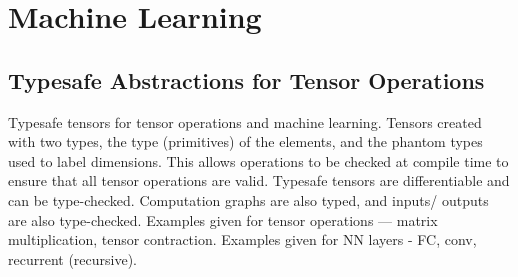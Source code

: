 \chapter {Machine Learning}

\section {Typesafe Abstractions for Tensor Operations \cite{chen2017typesafe}}
Typesafe tensors for tensor operations and machine learning. Tensors created
with two types, the type (primitives) of the elements, and the phantom types
used to label dimensions. This allows operations to be checked at compile time
to ensure that all tensor operations are valid. Typesafe tensors are
differentiable and can be type-checked. Computation graphs are also typed, and
inputs/ outputs are also type-checked. Examples given for tensor operations ---
matrix multiplication, tensor contraction. Examples given for NN layers - FC,
conv, recurrent (recursive).
